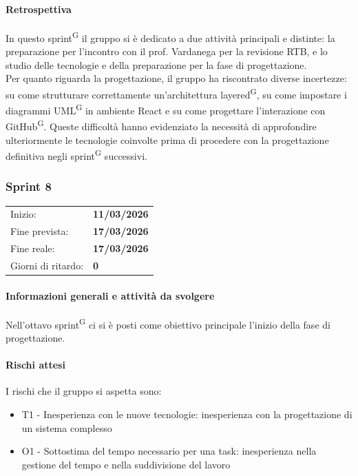 \documentclass[a4paper, 11pt]{article}
\newcommand{\subsubsubsection}[1]{\paragraph{#1}}
\begin{document}
\subsubsubsection{Retrospettiva}
In questo sprint\textsuperscript{G} il gruppo si è dedicato a due attività principali e distinte: la preparazione per l'incontro con il prof. Vardanega per la revisione RTB, e lo studio delle tecnologie e della preparazione per la fase di progettazione.\\
Per quanto riguarda la progettazione, il gruppo ha riscontrato diverse incertezze: su come strutturare correttamente un'architettura layered\textsuperscript{G}, su come impostare i diagrammi UML\textsuperscript{G} in ambiente React e su come progettare l'interazione con GitHub\textsuperscript{G}. Queste difficoltà hanno evidenziato la necessità di approfondire ulteriormente le tecnologie coinvolte prima di procedere con la progettazione definitiva negli sprint\textsuperscript{G} successivi.


\newpage

\subsubsection{Sprint 8}
\begin{tabular}{ll}
	Inizio: & \textbf{11/03/2026} \\
	Fine prevista: & \textbf{17/03/2026} \\
	Fine reale: & \textbf{17/03/2026} \\
	Giorni di ritardo: & \textbf{0} \\
\end{tabular}

\subsubsubsection{Informazioni generali e attività da svolgere}
Nell'ottavo sprint\textsuperscript{G} ci si è posti come obiettivo principale l'inizio della fase di progettazione.\\

\subsubsubsection{Rischi attesi}
I rischi che il gruppo si aspetta sono:
\begin{itemize}
	\item T1 - Inesperienza con le nuove tecnologie: inesperienza con la progettazione di un sistema complesso
	\item O1 - Sottostima del tempo necessario per una task: inesperienza nella gestione del tempo e nella suddivisione del lavoro
\end{itemize}
\end{document}
